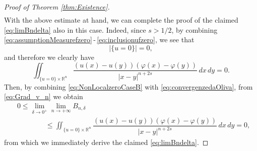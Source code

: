 \documentclass[11pt,a4paper]{amsart}
\def \R {\mathbb{R}}
\theoremstyle{definition}
\theoremstyle{plain}
\numberwithin{equation}{section}
\begin{document}
{\begin{proof}[Proof of Theorem \ref{thm:Existence}]
\begin{equation*}
\begin{split}
 \end{split}
\end{equation*}
 With the above estimate at hand, we can  complete
the proof
of the claimed \eqref{eq:limBndelta} also in this case. 
Indeed, since $s > 1/2$, by combining \eqref{eq:assumptionMeasurefzero}\,-\,\eqref{eq:inclusionufzero}, 
we see that
$$|\{u = 0\}| = 0,$$ 
and therefore we clearly have
\begin{equation} \label{eq:NonLocalzeroCaseB}
 \iint_{\{u = 0\}\times\R^n}\dfrac{(u(x)-u(y))(\varphi(x)-
 \varphi(y))}{|x-y|^{n+2s}}\,dx\,dy = 0.
 \end{equation}
 Then, by combining \eqref{eq:NonLocalzeroCaseB} with \eqref{eq:convergenzedaOliva}, from
 \eqref{eq:Grad_v_n} we obtain
 \begin{align*}
  & 0\leq \lim_{\delta\to 0^+}\lim_{n\to+\infty}
  B_{n,\delta}\\
  & \qquad\qquad\leq \iint_{\{u = 0\}\times\R^n}\dfrac{(u(x)-u(y))(\varphi(x)-
 \varphi(y))}{|x-y|^{n+2s}}\,dx\,dy = 0,
 \end{align*}
 from which we immediately derive the claimed \eqref{eq:limBndelta}.
\end{proof}  

}
\end{document}
